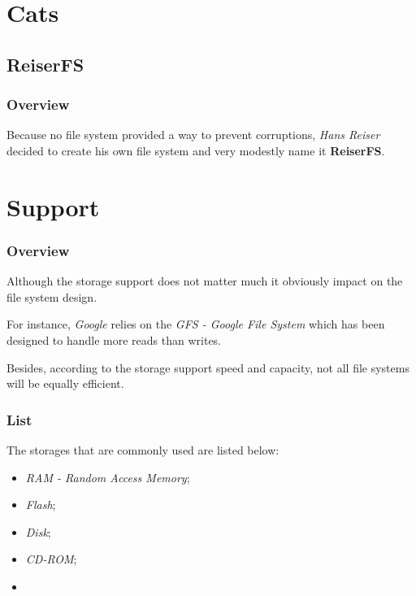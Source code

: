 %
%

\section{Cats}


\subsection{ReiserFS}


\begin{frame}
  \frametitle{Overview}

  Because no file system provided a way to prevent corruptions, \textit{Hans
  Reiser} decided to create his own file system and very modestly name
  it \textbf{ReiserFS}.

  \-

  
\end{frame}


%
%

\section{Support}


\begin{frame}
  \frametitle{Overview}

  Although the storage support does not matter much it obviously impact on
  the file system design.

  \-

  For instance, \textit{Google} relies on the \textit{GFS - Google File System}
  which has been designed to handle more reads than writes.

  \-

  Besides, according to the storage support speed and capacity, not all
  file systems will be equally efficient.
\end{frame}


\begin{frame}
  \frametitle{List}

  The storages that are commonly used are listed below:

  \begin{itemize}
    \item
      \textit{RAM - Random Access Memory};
    \item
      \textit{Flash};
    \item
      \textit{Disk};
    \item
      \textit{CD-ROM};
    \item
      \etc{}
  \end{itemize}
\end{frame}

